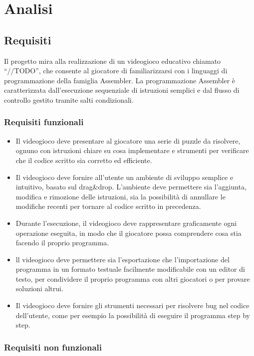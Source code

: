 \chapter{Analisi}

\section{Requisiti}

Il progetto mira alla realizzazione di un videogioco educativo chiamato
``//TODO'', che consente al giocatore di familiarizzarsi con i linguaggi
di programmazione della famiglia Assembler. La programmazione Assembler
è caratterizzata dall'esecuzione sequenziale di istruzioni semplici e
dal flusso di controllo gestito tramite salti condizionali.

\subsection{Requisiti funzionali}

\begin{itemize}
\item
  Il videogioco deve presentare al giocatore una serie di puzzle da
  risolvere, ognuno con istruzioni chiare su cosa implementare e
  strumenti per verificare che il codice scritto sia corretto ed
  efficiente.
\item
  Il videogioco deve fornire all'utente un ambiente di sviluppo semplice
  e intuitivo, basato sul drag\&drop. L'ambiente deve permettere sia
  l'aggiunta, modifica e rimozione delle istruzioni, sia la possibilità
  di annullare le modifiche recenti per tornare al codice scritto in
  precedenza.
\item
  Durante l'esecuzione, il videogioco deve rappresentare graficamente
  ogni operazione eseguita, in modo che il giocatore possa comprendere
  cosa stia facendo il proprio programma.
\item
  ll videogioco deve permettere sia l'esportazione che l'importazione
  del programma in un formato testuale facilmente modificabile con un
  editor di testo, per condividere il proprio programma con altri
  giocatori o per provare soluzioni altrui.
\item
  Il videogioco deve fornire gli strumenti necessari per risolvere bug
  nel codice dell'utente, come per esempio la possibilità di eseguire il
  programma step by step.
\end{itemize}

\subsection{Requisiti non funzionali}

